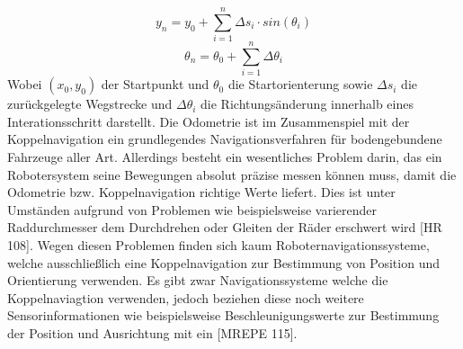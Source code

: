 \begin{equation}
y_{n} = y_{0} + \sum_{i=1}^{n} \Delta{}s_{i} \cdot sin(\theta{}_{i})
\end{equation}
\begin{equation}
\theta{}_{n} = \theta{}_{0} + \sum_{i=1}^{n} \Delta{}\theta{}_{i}
\end{equation}
Wobei $(x_{0},y_{0})$ der Startpunkt und $\theta{}_{0}$ die Startorienterung sowie $\Delta{}s_{i}$ die zurückgelegte Wegstrecke und $\Delta{}\theta{}_{i}$ die Richtungsänderung innerhalb eines Interationsschritt darstellt.
\newline
Die Odometrie ist im Zusammenspiel mit der Koppelnavigation ein grundlegendes Navigationsverfahren für bodengebundene Fahrzeuge aller Art. Allerdings besteht ein wesentliches Problem darin, das ein Robotersystem seine Bewegungen absolut präzise messen können muss, damit die Odometrie bzw. Koppelnavigation richtige Werte liefert. Dies ist unter Umständen aufgrund
von Problemen wie beispielsweise varierender Raddurchmesser dem Durchdrehen oder Gleiten der Räder erschwert wird [HR 108].
\newline
Wegen diesen Problemen finden sich kaum Roboternavigationssysteme, welche ausschließlich eine Koppelnavigation zur Bestimmung von Position und Orientierung verwenden. Es gibt zwar Navigationssysteme welche die Koppelnaviagtion verwenden, jedoch beziehen diese noch weitere Sensorinformationen wie beispielsweise Beschleunigungswerte zur Bestimmung der Position und Ausrichtung mit ein [MREPE 115].
